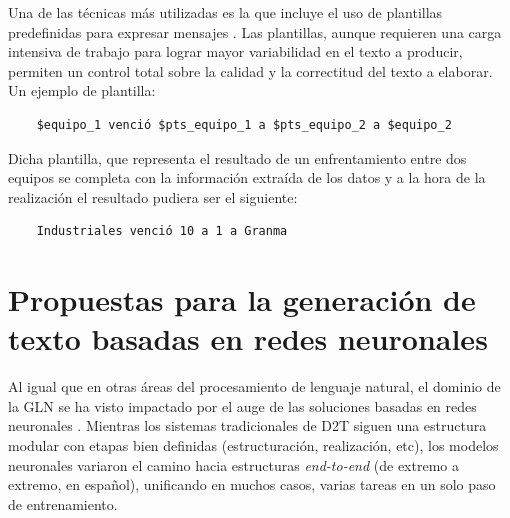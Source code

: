     Una de las t\'ecnicas m\'as utilizadas es la que incluye el uso de plantillas predefinidas para expresar mensajes . Las 
plantillas, aunque requieren una carga intensiva de trabajo para lograr mayor variabilidad en el texto a producir, permiten un control total sobre 
la calidad y la correctitud del texto a elaborar. Un ejemplo de plantilla:

\begin{verbatim}
    $equipo_1 venció $pts_equipo_1 a $pts_equipo_2 a $equipo_2
\end{verbatim}

    Dicha plantilla, que representa el resultado de un enfrentamiento entre dos equipos se completa con la información extraída de los datos y a la hora de 
la realización el resultado pudiera ser el siguiente:

\begin{verbatim}
    Industriales venció 10 a 1 a Granma
\end{verbatim}

\section{Propuestas para la generación de texto basadas en redes neuronales }
    Al igual que en otras áreas del procesamiento de lenguaje natural, el dominio de la GLN se ha visto 
impactado por el auge de las soluciones basadas en redes neuronales . 
Mientras los sistemas tradicionales de D2T siguen una estructura modular con etapas bien definidas (estructuración, realización, etc), 
los modelos neuronales variaron el camino hacia estructuras \emph{end-to-end} (de extremo a extremo, en español), unificando 
en muchos casos, varias tareas en un solo paso de entrenamiento.

